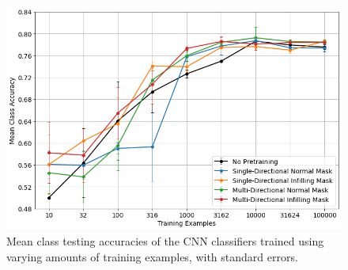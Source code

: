 \begin{figure}[h]
	\centering
	\includegraphics[width=\textwidth]{images/cpc_cnn_results.png}
	\caption{Mean class testing accuracies of the CNN classifiers trained using varying amounts of training examples, with standard errors.}
	\label{fig:cpc_cnn_results}
\end{figure}


